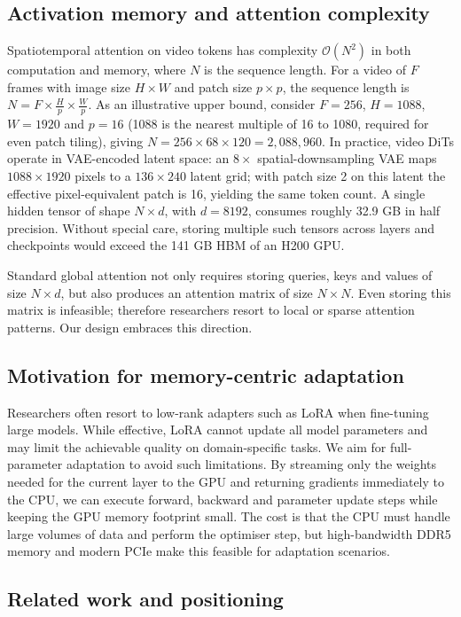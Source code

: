 \documentclass[11pt, letterpaper]{article}
\begin{document}
\subsection{Activation memory and attention complexity}
Spatiotemporal attention on video tokens has complexity $\mathcal{O}(N^2)$ in both computation and memory, where $N$ is the sequence length. For a video of $F$ frames with image size $H\times W$ and patch size $p\times p$, the sequence length is $N = F \times \frac{H}{p} \times \frac{W}{p}$. As an illustrative upper bound, consider $F = 256$, $H = 1088$, $W = 1920$ and $p = 16$ (1088 is the nearest multiple of 16 to 1080, required for even patch tiling), giving $N = 256 \times 68 \times 120 = 2{,}088{,}960$. In practice, video DiTs operate in VAE-encoded latent space: an $8\times$ spatial-downsampling VAE maps $1088\times1920$ pixels to a $136\times240$ latent grid; with patch size 2 on this latent the effective pixel-equivalent patch is 16, yielding the same token count. A single hidden tensor of shape $N\times d$, with $d = 8192$, consumes roughly 32.9 GB in half precision. Without special care, storing multiple such tensors across layers and checkpoints would exceed the 141 GB HBM of an H200 GPU.

Standard global attention not only requires storing queries, keys and values of size $N\times d$, but also produces an attention matrix of size $N\times N$. Even storing this matrix is infeasible; therefore researchers resort to local or sparse attention patterns. Our design embraces this direction.

\subsection{Motivation for memory-centric adaptation}
Researchers often resort to low-rank adapters such as LoRA when fine-tuning large models. While effective, LoRA cannot update all model parameters and may limit the achievable quality on domain-specific tasks. We aim for full-parameter adaptation to avoid such limitations. By streaming only the weights needed for the current layer to the GPU and returning gradients immediately to the CPU, we can execute forward, backward and parameter update steps while keeping the GPU memory footprint small. The cost is that the CPU must handle large volumes of data and perform the optimiser step, but high-bandwidth DDR5 memory and modern PCIe make this feasible for adaptation scenarios.

\subsection{Related work and positioning}
\end{document}
